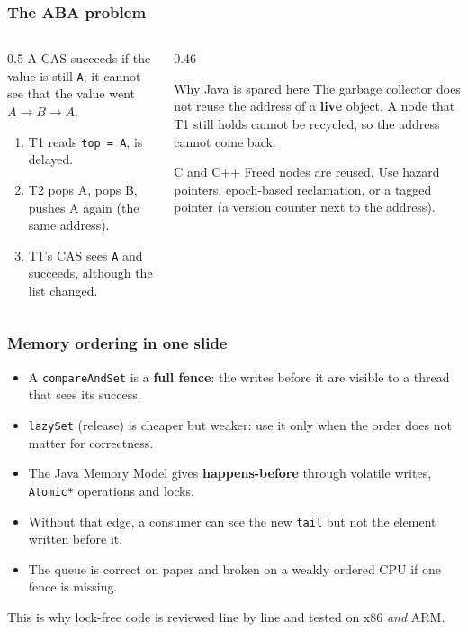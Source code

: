 \documentclass[aspectratio=169,10pt,compress]{beamer}
\begin{document}
\begin{frame}[t,fragile] \frametitle{The ABA problem}
  \begin{columns}[T]
    \begin{column}{0.5\textwidth}
      \small A CAS succeeds if the value is still \texttt{A}; it cannot see that the value went $A \to B \to A$.
      \begin{enumerate}\small
        \item T1 reads \texttt{top = A}, is delayed.
        \item T2 pops A, pops B, pushes A again (the same address).
        \item T1's CAS sees \texttt{A} and succeeds, although the list changed.
      \end{enumerate}
    \end{column}
    \begin{column}{0.46\textwidth}
      \begin{block}{Why Java is spared here}
        \small The garbage collector does not reuse the address of a \textbf{live} object. A node that T1 still holds cannot be recycled, so the address cannot come back.
      \end{block}
      \begin{block}{C and C++}
        \small Freed nodes are reused. Use hazard pointers, epoch-based reclamation, or a tagged pointer (a version counter next to the address).
      \end{block}
    \end{column}
  \end{columns}
\end{frame}




\begin{frame}[t,fragile] \frametitle{Memory ordering in one slide}
  \begin{itemize}\small
    \item A \texttt{compareAndSet} is a \textbf{full fence}: the writes before it are visible to a thread that sees its success.
    \item \texttt{lazySet} (release) is cheaper but weaker: use it only when the order does not matter for correctness.
    \item The Java Memory Model gives \textbf{happens-before} through volatile writes, \texttt{Atomic*} operations and locks.
    \item Without that edge, a consumer can see the new \texttt{tail} but not the element written before it.
    \item The queue is correct on paper and broken on a weakly ordered CPU if one fence is missing.
  \end{itemize}
  \vspace{0.4em}
  \small This is why lock-free code is reviewed line by line and tested on x86 \emph{and} ARM.
\end{frame}
\end{document}
